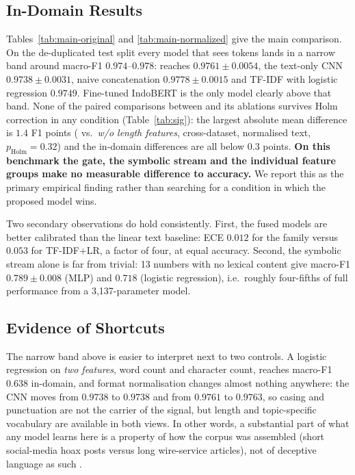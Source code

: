 \subsection{In-Domain Results}
\label{sec:indomain}

Tables~\ref{tab:main-original} and \ref{tab:main-normalized} give the main comparison. On the
de-duplicated \iph{} test split every model that sees tokens lands in a narrow band around
macro-F1 $0.974$--$0.978$: \menet{} reaches $0.9761{\pm}0.0054$, the text-only CNN $0.9738{\pm}0.0031$,
naive concatenation $0.9778{\pm}0.0015$ and TF-IDF with logistic regression $0.9749$. Fine-tuned
IndoBERT is the only model clearly above that band. None of the paired comparisons between \menet{} and
its ablations survives Holm correction in any condition (Table~\ref{tab:sig}): the largest absolute mean
difference is $1.4$ F1 points (\menet{} vs.\ \emph{w/o length features}, cross-dataset, normalised text,
$p_{\text{Holm}}=0.32$) and the in-domain differences are all below $0.3$ points. \textbf{On this
benchmark the gate, the symbolic stream and the individual feature groups make no measurable difference to
accuracy.} We report this as the primary empirical finding rather than searching for a condition in which
the proposed model wins.

Two secondary observations do hold consistently. First, the fused models are better calibrated than the
linear text baseline: ECE $0.012$ for the \menet{} family versus $0.053$ for TF-IDF$+$LR, a factor of four,
at equal accuracy. Second, the symbolic stream alone is far from trivial: 13 numbers with no lexical
content give macro-F1 $0.789{\pm}0.008$ (MLP) and $0.718$ (logistic regression), i.e.\ roughly
four-fifths of full performance from a 3{,}137-parameter model.

\subsection{Evidence of Shortcuts}
\label{sec:shortcuts}

The narrow band above is easier to interpret next to two controls. A logistic regression on \emph{two
features}, word count and character count, reaches macro-F1 $0.638$ in-domain, and format normalisation
changes almost nothing anywhere: the CNN moves from $0.9738$ to $0.9738$ and \menet{} from $0.9761$ to
$0.9763$, so casing and punctuation are not the carrier of the signal, but length and topic-specific
vocabulary are available in both views. In other words, a substantial part of what any model learns here
is a property of how the corpus was assembled (short social-media hoax posts versus long wire-service
articles), not of deceptive language as such \citep{gururangan2018annotation,geirhos2020shortcut}.

